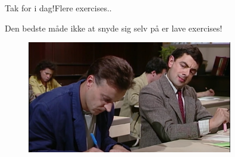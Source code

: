 \documentclass{beamer}
\begin{document}
\begin{frame}{Tak for i dag!}{Flere exercises..}

    Den bedste måde ikke at snyde sig selv på er lave exercises!

    \begin{figure}[h]
        \centering
        \includegraphics[width=0.8\textwidth]{exercises}
    \end{figure}
    
\end{frame}
\end{document}
